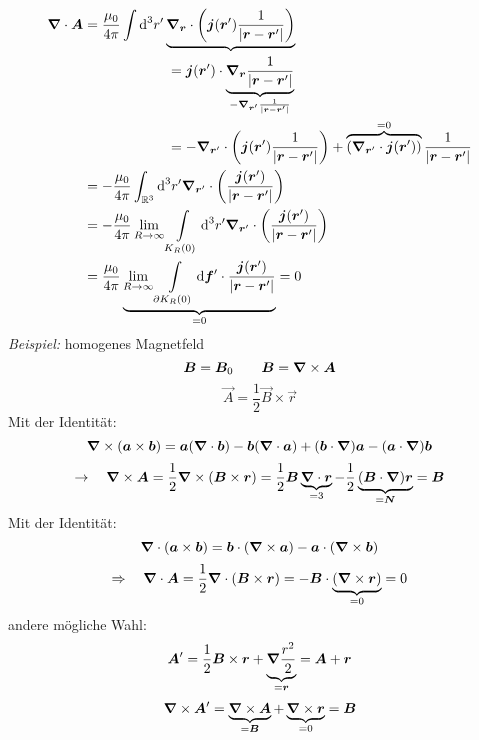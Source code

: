 \begin{align*}
\bm{\nabla} \cdot \bm{A} &= \frac{\mu_0}{4 \pi} \int \textrm{d}^3 r' \underbrace{\bm{\nabla}_{\bm{r}} \cdot \left(\bm{j}(\bm{r}') \frac{1}{|\bm{r} - \bm{r}'|}\right)}\\
& \qquad \qquad \qquad = \bm{j}(\bm{r}') \cdot \underbrace{\bm{\nabla}_{\bm{r}} \frac{1}{|\bm{r} - \bm{r}'|}}_{-\bm{\nabla}_{\bm{r}'} \frac{1}{|\bm{r} - \bm{r}'|}}\\
& \qquad \qquad \qquad = - \bm{\nabla}_{\bm{r}'} \cdot \left(\bm{j}(\bm{r}') \frac{1}{|\bm{r} - \bm{r}'|}\right) + \overbrace{\left(\bm{\nabla}_{\bm{r}'} \cdot \bm{j}(\bm{r}')\right)}^{=0} \frac{1}{|\bm{r} - \bm{r}'|}\\
&= - \frac{\mu_0}{4 \pi} \int_{\mathbb{R}^3} \textrm{d}^3 r' \bm{\nabla}_{\bm{r}'} \cdot \left(\frac{\bm{j}(\bm{r}')}{|\bm{r} - \bm{r}'|}\right)\\
&= - \frac{\mu_0}{4 \pi} \lim\limits_{R \to \infty} \int\limits_{K_R(0)} \textrm{d}^3 r' \bm{\nabla}_{\bm{r}'} \cdot \left(\frac{\bm{j}(\bm{r}')}{|\bm{r} - \bm{r}'|}\right)\\
&= \frac{\mu_0}{4 \pi} \underbrace{\lim\limits_{R\to \infty} \int\limits_{\partial K_R(0)} \textrm{d} \bm{f}' \cdot \frac{\bm{j} (\bm{r}')}{|\bm{r} - \bm{r}'|}}_{=0} = 0
\end{align*}
\emph{Beispiel:} homogenes Magnetfeld
\begin{equation*}
\bm{B} = \bm{B}_0 \qquad \bm{B} = \bm{\nabla} \times \bm{A}
\end{equation*}
\begin{equation*}
\vec{A} = \frac{1}{2} \vec{B} \times \vec{r}
\end{equation*}
Mit der Identität:
\begin{equation*}
\bm{\nabla} \times (\bm{a} \times \bm{b}) = \bm{a} (\bm{\nabla} \cdot \bm{b}) - \bm{b} (\bm{\nabla} \cdot \bm{a}) + (\bm{b} \cdot \bm{\nabla}) \bm{a} - (\bm{a} \cdot \bm{\nabla}) \bm{b}
\end{equation*}
\begin{equation*}
\rightarrow \quad \bm{\nabla} \times \bm{A} = \frac{1}{2} \bm{\nabla} \times (\bm{B} \times \bm{r}) = \frac{1}{2} \bm{B} \underbrace{\bm{\nabla} \cdot \bm{r}}_{= 3} - \frac{1}{2} \underbrace{(\bm{B} \cdot \bm{\nabla}) \bm{r}}_{= \bm{N}} = \bm{B}
\end{equation*}
Mit der Identität:
\begin{equation*}
\bm{\nabla} \cdot (\bm{a} \times \bm{b}) = \bm{b} \cdot (\bm{\nabla} \times \bm{a}) - \bm{a} \cdot (\bm{\nabla} \times \bm{b})
\end{equation*}
\begin{equation*}
\Rightarrow \quad \bm{\nabla} \cdot \bm{A} = \frac{1}{2} \bm{\nabla} \cdot \left(\bm{B} \times \bm{r}\right) = - \bm{B} \cdot \underbrace{\left(\bm{\nabla} \times \bm{r}\right)}_{= 0} = 0
\end{equation*}
andere mögliche Wahl:
\begin{equation*}
\bm{A}' = \frac{1}{2} \bm{B} \times \bm{r} + \underbrace{\bm{\nabla} \frac{r^2}{2}}_{=\bm{r}} = \bm{A} + \bm{r}
\end{equation*}
\begin{equation*}
\bm{\nabla} \times \bm{A}' = \underbrace{\bm{\nabla} \times \bm{A}}_{= \bm{B}} + \underbrace{\bm{\nabla} \times \bm{r}}_{= 0} = \bm{B}
\end{equation*}

